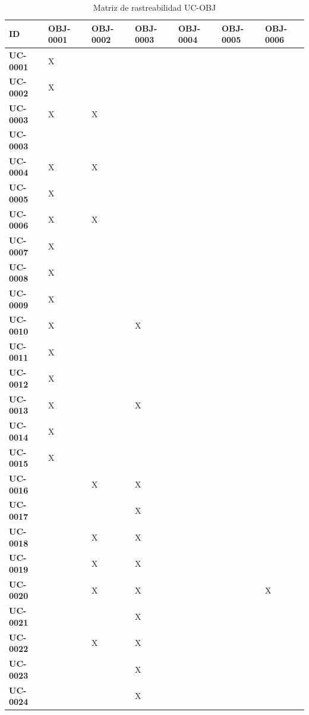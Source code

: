 \documentclass[11pt, a4paper]{article}
\begin{document}
{\begin{center}
{\small
\begin{longtable}{|p{2.2cm}|p{2.0cm}|p{2.0cm}|p{2.0cm}|p{2.0cm}|p{2.0cm}|p{2.0cm}|}
\caption{Matriz de rastreabilidad UC-OBJ} \label{tab:matriz-uc-obj} \\
\hline
\textbf{ID} & \textbf{OBJ-0001} & \textbf{OBJ-0002} & \textbf{OBJ-0003} & \textbf{OBJ-0004} & \textbf{OBJ-0005} & \textbf{OBJ-0006} \\
\hline
\hline
\endhead
\textbf{UC-0001} & X &  &  &  &  &  \\
\hline
\textbf{UC-0002} & X &  &  &  &  &  \\
\hline
\textbf{UC-0003} & X & X &  &  &  &  \\
\hline
\textbf{UC-0003} &  &  &  &  &  &  \\
\hline
\textbf{UC-0004} & X & X &  &  &  &  \\
\hline
\textbf{UC-0005} & X &  &  &  &  &  \\
\hline
\textbf{UC-0006} & X & X &  &  &  &  \\
\hline
\textbf{UC-0007} & X &  &  &  &  &  \\
\hline
\textbf{UC-0008} & X &  &  &  &  &  \\
\hline
\textbf{UC-0009} & X &  &  &  &  &  \\
\hline
\textbf{UC-0010} & X &  & X &  &  &  \\
\hline
\textbf{UC-0011} & X &  &  &  &  &  \\
\hline
\textbf{UC-0012} & X &  &  &  &  &  \\
\hline
\textbf{UC-0013} & X &  & X &  &  &  \\
\hline
\textbf{UC-0014} & X &  &  &  &  &  \\
\hline
\textbf{UC-0015} & X &  &  &  &  &  \\
\hline
\textbf{UC-0016} &  & X & X &  &  &  \\
\hline
\textbf{UC-0017} &  &  & X &  &  &  \\
\hline
\textbf{UC-0018} &  & X & X &  &  &  \\
\hline
\textbf{UC-0019} &  & X & X &  &  &  \\
\hline
\textbf{UC-0020} &  & X & X &  &  & X \\
\hline
\textbf{UC-0021} &  &  & X &  &  &  \\
\hline
\textbf{UC-0022} &  & X & X &  &  &  \\
\hline
\textbf{UC-0023} &  &  & X &  &  &  \\
\hline
\textbf{UC-0024} &  &  & X &  &  &  \\

\end{longtable}}
\end{center}}
\end{document}
